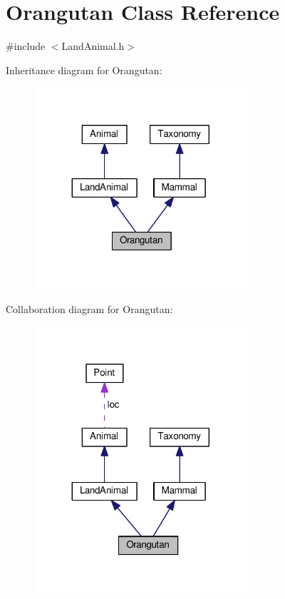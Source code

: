 \hypertarget{classOrangutan}{}\section{Orangutan Class Reference}
\label{classOrangutan}


{\ttfamily \#include $<$Land\+Animal.\+h$>$}



Inheritance diagram for Orangutan\+:
\nopagebreak
\begin{figure}[H]
\begin{center}
\leavevmode
\includegraphics[width=224pt]{classOrangutan__inherit__graph}
\end{center}
\end{figure}


Collaboration diagram for Orangutan\+:
\nopagebreak
\begin{figure}[H]
\begin{center}
\leavevmode
\includegraphics[width=224pt]{classOrangutan__coll__graph}
\end{center}
\end{figure}
